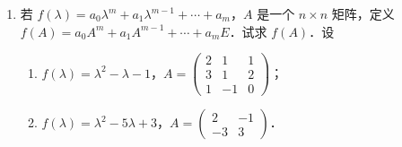 \begin{enumerate}
\begin{enumerate}
  \anssub
    \item $(2,3,-1)\begin{pmatrix}1\\-1\\-1\end{pmatrix}$，$\begin{pmatrix}1\\-1\\-1\end{pmatrix}(2,3,-1)$；
  \anssub
    \item $(x,y,1)\begin{pmatrix}a_{11}&a_{12}&b_1\\a_{12}&a_{22}&b_2\\b_1&b_2&c\end{pmatrix}\begin{pmatrix}x\\y\\1\end{pmatrix}$；
  \anssub
    \item $\begin{pmatrix}1&-1&-1&-1\\-1&1&-1&-1\\-1&-1&1&-1\\-1&-1&-1&1\end{pmatrix}^2$，$\begin{pmatrix}1&-1&-1&-1\\-1&1&-1&-1\\-1&-1&1&-1\\-1&-1&-1&1\end{pmatrix}^n$；
  \anssub
    \item $\begin{pmatrix}\lambda&1&0\\0&\lambda&1\\0&0&\lambda\end{pmatrix}^n$．
  \anssub
  \end{enumerate}
  \item 若 $f(\lambda)=a_0\lambda^m+a_1\lambda^{m-1}+\cdots+a_m$，$A$ 是一个 $n\times n$ 矩阵，定义 $f(A)=a_0A^m+a_1A^{m-1}+\cdots+a_mE$．试求 $f(A)$．设
  \begin{enumerate}
    \item $f(\lambda)=\lambda^2-\lambda-1$，$A=\begin{pmatrix}2&1&1\\3&1&2\\1&-1&0\end{pmatrix}$；
  \anssub
    \item $f(\lambda)=\lambda^2-5\lambda+3$，$A=\begin{pmatrix}2&-1\\-3&3\end{pmatrix}$．

\end{enumerate}
\end{enumerate}
